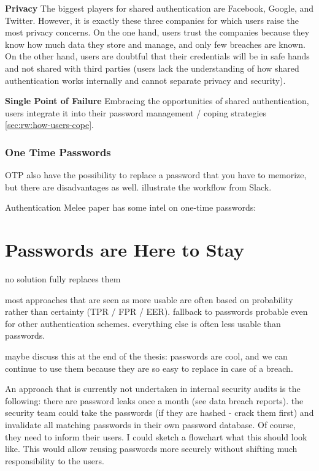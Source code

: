 \textbf{Privacy} The biggest players for shared authentication are Facebook, Google, and Twitter. However, it is exactly these three companies for which users raise the most privacy concerns. On the one hand, users trust the companies because they know how much data they store and manage, and only few breaches are known. On the other hand, users are doubtful that their credentials will be in safe hands and not shared with third parties (users lack the understanding of how shared authentication works internally and cannot separate privacy and security). 

\textbf{Single Point of Failure} Embracing the opportunities of shared authentication, users integrate it into their password management / coping strategies \ref{sec:rw:how-users-cope}. 

	
\subsubsection{One Time Passwords}

OTP also have the possibility to replace a password that you have to memorize, but there are disadvantages as well. 
illustrate the workflow from Slack.

Authentication Melee paper has some intel on one-time passwords: \cite{Ruoti2015AuthenticationMelee}


\section{Passwords are Here to Stay}
no solution fully replaces them

most approaches that are seen as more usable are often based on probability rather than certainty (TPR / FPR / EER). fallback to passwords probable even for other authentication schemes. everything else is often less usable than passwords. 


maybe discuss this at the end of the thesis: passwords are cool, and we can continue to use them because they are so easy to replace in case of a breach. 

An approach that is currently not undertaken in internal security audits is the following: there are password leaks once a month (see data breach reports). the security team could take the passwords (if they are hashed - crack them first) and invalidate all matching passwords in their own password database. Of course, they need to inform their users. I could sketch a flowchart what this should look like. This would allow reusing passwords more securely without shifting much responsibility to the users. 

\cite{Kirlappos2012SecurityEducation,Loutfi2015PasswordsOtherSideOfTheFence,DeAngeli2005PictureThousandWords,Florencio2013WhereDoAllTheAttacksGo,Herley2008ProfitlessEndeavor,Sasse2015,Dittrich2009,Herley2009SoLongThanksExternalities,Vantaggiato2015WeStillNeedPasswords,Florencio2010WhereDoPoliciesComeFrom,Schrittwieser2013,Bonneau2015ImperfectAuthentication,Cyber2014,Florencio2007DoStrongWebPasswords,Sasse2005UsableSecurityPosition,Aebischer2017PicoInTheWild,Forget2007HelpingUsers,Herley2009IfWereSoSmart,Acar2016NotYourDeveloper,Sasse2016,Renaud2009VisualSnakeOil}

